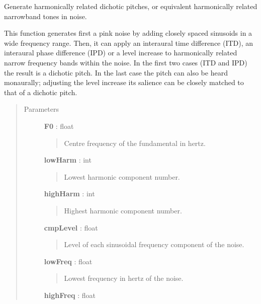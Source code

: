 \documentclass[a4paper,12pt,english]{sphinxmanual}
\begin{document}
\begin{fulllineitems}
\label{sndlib:sndlib.makeSimpleDichotic}
Generate harmonically related dichotic pitches, or equivalent
harmonically related narrowband tones in noise.

This function generates first a pink noise by adding closely spaced
sinusoids in a wide frequency range. Then, it can apply an interaural
time difference (ITD), an interaural phase difference (IPD) or a
level increase to harmonically related narrow frequency bands
within the noise. In the first two cases (ITD and IPD) the result
is a dichotic pitch. In the last case the pitch can also be heard
monaurally; adjusting the level increase its salience can be closely
matched to that of a dichotic pitch.
\begin{quote}\begin{description}
\item[{Parameters }] \leavevmode
\textbf{F0} : float
\begin{quote}

Centre frequency of the fundamental in hertz.
\end{quote}

\textbf{lowHarm} : int
\begin{quote}

Lowest harmonic component number.
\end{quote}

\textbf{highHarm} : int
\begin{quote}

Highest harmonic component number.
\end{quote}

\textbf{cmpLevel} : float
\begin{quote}

Level of each sinusoidal frequency component of the noise.
\end{quote}

\textbf{lowFreq} : float
\begin{quote}

Lowest frequency in hertz of the noise.
\end{quote}

\textbf{highFreq} : float
\begin{quote}


\end{quote}
\end{description}
\end{quote}
\end{fulllineitems}
\end{document}
